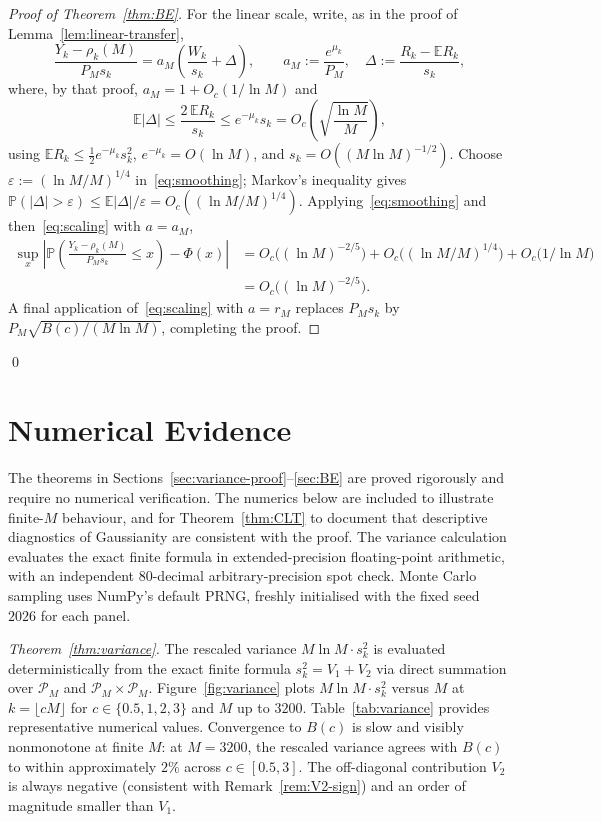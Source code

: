 \documentclass[11pt]{article}
\theoremstyle{remark}
\newcommand{\PP}{\mathbb{P}}
\newcommand{\EE}{\mathbb{E}}
\newcommand{\eps}{\varepsilon}
\newcommand{\PM}{\mathcal{P}_M}
\begin{document}
\begin{proof}[Proof of Theorem~\ref{thm:BE}]
For the linear scale, write, as in the proof of Lemma~\ref{lem:linear-transfer},
\[
\frac{Y_k - \rho_k(M)}{P_M s_k} = a_M \left( \frac{W_k}{s_k} + \Delta \right),
\qquad
a_M := \frac{e^{\mu_k}}{P_M},
\quad
\Delta := \frac{R_k - \EE R_k}{s_k},
\]
where, by that proof, $a_M = 1 + O_c(1/\ln M)$ and
\[
\EE |\Delta| \leq \frac{2\, \EE R_k}{s_k} \leq e^{-\mu_k} s_k = O_c\!\left( \sqrt{\frac{\ln M}{M}} \right),
\]
using $\EE R_k \leq \tfrac12 e^{-\mu_k} s_k^2$, $e^{-\mu_k} = O(\ln M)$, and $s_k = O((M \ln M)^{-1/2})$. Choose $\eps := (\ln M/M)^{1/4}$ in~\eqref{eq:smoothing}; Markov's inequality gives $\PP(|\Delta| > \eps) \leq \EE|\Delta|/\eps = O_c((\ln M/M)^{1/4})$. Applying~\eqref{eq:smoothing} and then~\eqref{eq:scaling} with $a = a_M$,
\begin{align*}
\sup_x \left| \PP\!\left( \frac{Y_k - \rho_k(M)}{P_M s_k} \leq x \right) - \Phi(x) \right|
&= O_c\bigl( (\ln M)^{-2/5} \bigr) + O_c\bigl( (\ln M/M)^{1/4} \bigr) + O_c\bigl( 1/\ln M \bigr) \\
&= O_c\bigl( (\ln M)^{-2/5} \bigr).
\end{align*}
A final application of~\eqref{eq:scaling} with $a = r_M$ replaces $P_M s_k$ by $P_M \sqrt{B(c)/(M \ln M)}$, completing the proof.
\end{proof}
\qed

\section{Numerical Evidence}\label{sec:numerics}

The theorems in Sections~\ref{sec:variance-proof}--\ref{sec:BE} are proved rigorously and require no numerical verification. The numerics below are included to illustrate finite-$M$ behaviour, and for Theorem~\ref{thm:CLT} to document that descriptive diagnostics of Gaussianity are consistent with the proof. The variance calculation evaluates the exact finite formula in extended-precision floating-point arithmetic, with an independent 80-decimal arbitrary-precision spot check. Monte Carlo sampling uses NumPy's default PRNG, freshly initialised with the fixed seed $2026$ for each panel.

\emph{Theorem~\ref{thm:variance}.} The rescaled variance $M \ln M \cdot s_k^2$ is evaluated deterministically from the exact finite formula $s_k^2 = V_1 + V_2$ via direct summation over $\PM$ and $\PM \times \PM$. Figure~\ref{fig:variance} plots $M \ln M \cdot s_k^2$ versus $M$ at $k = \lfloor cM \rfloor$ for $c \in \{0.5, 1, 2, 3\}$ and $M$ up to $3200$. Table~\ref{tab:variance} provides representative numerical values. Convergence to $B(c)$ is slow and visibly nonmonotone at finite $M$: at $M = 3200$, the rescaled variance agrees with $B(c)$ to within approximately $2\%$ across $c \in [0.5, 3]$. The off-diagonal contribution $V_2$ is always negative (consistent with Remark~\ref{rem:V2-sign}) and an order of magnitude smaller than $V_1$.
\end{document}
